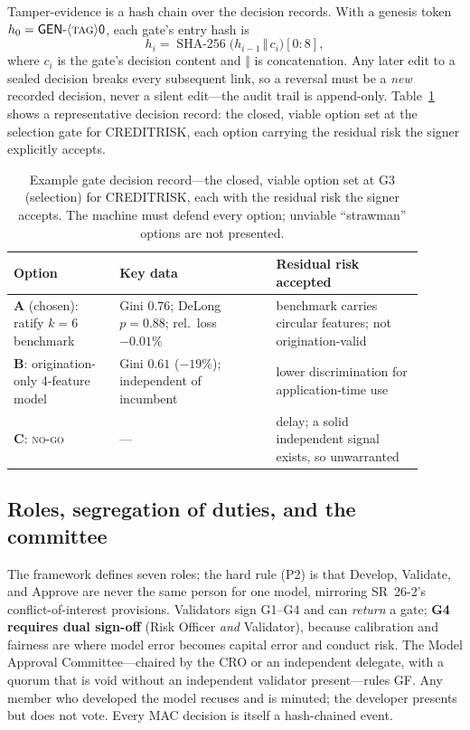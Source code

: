 \documentclass[9pt,journal]{IEEEtai}
\begin{document}
Tamper-evidence is a hash chain over the decision records. With a genesis token
$h_0=\textsf{GEN-}\langle\textsc{tag}\rangle\textsf{0}$, each gate's entry hash is
\begin{equation}
h_i=\operatorname{SHA\text{-}256}\!\bigl(h_{i-1}\,\Vert\,c_i\bigr)[0{:}8],
\label{eq:hash}
\end{equation}
where $c_i$ is the gate's decision content and $\Vert$ is concatenation. Any later edit to a
sealed decision breaks every subsequent link, so a reversal must be a \emph{new} recorded
decision, never a silent edit---the audit trail is append-only. Table~\ref{tab:gdr} shows a
representative decision record: the closed, viable option set at the selection gate for CREDITRISK,
each option carrying the residual risk the signer explicitly accepts.

\begin{table}[!t]
\centering
\caption{Example gate decision record---the closed, viable option set at G3 (selection) for
CREDITRISK, each with the residual risk the signer accepts. The machine must defend every option;
unviable ``strawman'' options are not presented.}
\label{tab:gdr}
\footnotesize
\begin{tabular}{@{}p{0.235\linewidth}p{0.345\linewidth}p{0.32\linewidth}@{}}
\toprule
Option & Key data & Residual risk accepted \\
\midrule
\textbf{A} (chosen): ratify $k{=}6$ benchmark & Gini $0.76$; DeLong $p{=}0.88$; rel.\ loss $-0.01\%$ & benchmark carries circular features; not origination-valid \\
\textbf{B}: origination-only 4-feature model & Gini $0.61$ ($-19\%$); independent of incumbent & lower discrimination for application-time use \\
\textbf{C}: \textsc{no-go} & --- & delay; a solid independent signal exists, so unwarranted \\
\bottomrule
\end{tabular}
\end{table}

\subsection{Roles, segregation of duties, and the committee}
The framework defines seven roles; the hard rule (P2) is that Develop, Validate, and Approve are never
the same person for one model, mirroring SR~26-2's conflict-of-interest provisions. Validators
sign G1--G4 and can \emph{return} a gate; \textbf{G4 requires dual sign-off} (Risk Officer
\emph{and} Validator), because calibration and fairness are where model error becomes capital
error and conduct risk. The Model Approval Committee---chaired by the CRO or an independent
delegate, with a quorum that is void without an independent validator present---rules GF. Any
member who developed the model recuses and is minuted; the developer presents but does not vote.
Every MAC decision is itself a hash-chained event.
\end{document}
